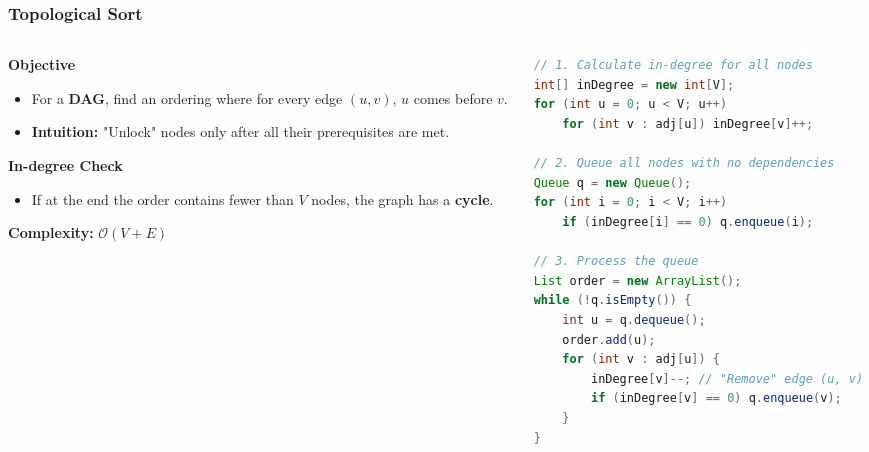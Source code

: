 \documentclass[8pt,aspectratio=169]{beamer}
\begin{document}
\begin{frame}[t, fragile]
\frametitle{Topological Sort}

\begin{columns}[T]
    \begin{column}{0.45\textwidth}
        \textbf{Objective}
        \begin{itemize}
            \item For a \textbf{DAG}, find an ordering where for every edge $(u, v)$, $u$ comes before $v$.
            \item \textbf{Intuition:} "Unlock" nodes only after all their prerequisites are met.
        \end{itemize}
        \vspace{0.3cm}
        \textbf{In-degree Check}
        \begin{itemize}
            \item If at the end the order contains fewer than $V$ nodes, the graph has a \textbf{cycle}.
        \end{itemize}
        \textbf{Complexity:} $\mathcal{O}(V+E)$
    \end{column}

    \begin{column}{0.55\textwidth}
\begin{lstlisting}[language=Java, basicstyle=\tiny\ttfamily, frame=single]
// 1. Calculate in-degree for all nodes
int[] inDegree = new int[V];
for (int u = 0; u < V; u++)
    for (int v : adj[u]) inDegree[v]++;

// 2. Queue all nodes with no dependencies
Queue q = new Queue();
for (int i = 0; i < V; i++)
    if (inDegree[i] == 0) q.enqueue(i);

// 3. Process the queue
List order = new ArrayList();
while (!q.isEmpty()) {
    int u = q.dequeue();
    order.add(u);
    for (int v : adj[u]) {
        inDegree[v]--; // "Remove" edge (u, v)
        if (inDegree[v] == 0) q.enqueue(v);
    }
}
\end{lstlisting}
    \end{column}
\end{columns}
\end{frame}
\end{document}
